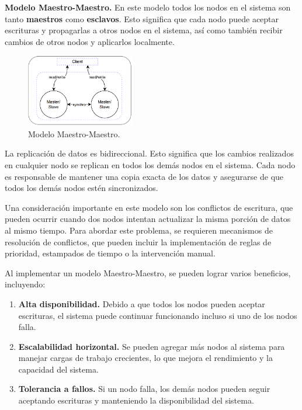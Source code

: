 \documentclass[pdflatex,sn-mathphys-num]{sn-jnl}
\theoremstyle{thmstyleone}%
\theoremstyle{thmstyletwo}%
\theoremstyle{thmstylethree}%
\begin{document}
\vspace{0.1cm}

\noindent
\textbf{Modelo Maestro-Maestro.} En este modelo todos los nodos en el sistema son tanto \textbf{maestros} como \textbf{esclavos}. Esto significa que cada nodo puede aceptar escrituras y propagarlas a otros nodos en el sistema, así como también recibir cambios de otros nodos y aplicarlos localmente.

\begin{figure}
    \centering
    \includegraphics[width=0.42\textwidth]{figs/maestro-maestro.png}
    \caption{Modelo Maestro-Maestro.}
\end{figure}

La replicación de datos es bidireccional. Esto significa que los cambios realizados en cualquier nodo se replican en todos los demás nodos en el sistema. Cada nodo es responsable de mantener una copia exacta de los datos y asegurarse de que todos los demás nodos estén sincronizados.

Una consideración importante en este modelo son los conflictos de escritura, que pueden ocurrir cuando dos nodos intentan actualizar la misma porción de datos al mismo tiempo. Para abordar este problema, se requieren mecanismos de resolución de conflictos, que pueden incluir la implementación de reglas de prioridad, estampados de tiempo o la intervención manual.

Al implementar un modelo Maestro-Maestro, se pueden lograr varios beneficios, incluyendo:

\begin{enumerate}
    \item  \textbf{Alta disponibilidad.} Debido a que todos los nodos pueden aceptar escrituras, el sistema puede continuar funcionando incluso si uno de los nodos falla.

    \item \textbf{Escalabilidad horizontal.} Se pueden agregar más nodos al sistema para manejar cargas de trabajo crecientes, lo que mejora el rendimiento y la capacidad del sistema.

    \item \textbf{Tolerancia a fallos.} Si un nodo falla, los demás nodos pueden seguir aceptando escrituras y manteniendo la disponibilidad del sistema.
\end{enumerate}
\end{document}
